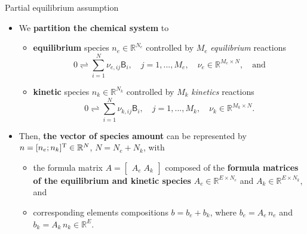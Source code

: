 \begin{frame}{Partial equilibrium assumption}
	\small
	\begin{itemize}
	\item We \alert{\bf partition the chemical system} to
	\begin{itemize}
		\item {\bf equilibrium} species $n_{e} \in \mathbb{R}^{{N}_{e}}$ controlled by $M_e$ \emph{equilibrium} reactions
		\[ 0\rightleftharpoons\sum_{i=1}^{N}\nu_{e,ij}\mathsf{B}_{i}, \quad j=1,...,M_{e},\quad \nu_{e} \in \mathbb{R}^{M_{e}\times N}, \quad \mbox{and}\]
		\item {\bf kinetic} species $n_{k}\in\mathbb{R}^{{N}_{k}}$ controlled by $M_k$ \emph{kinetics} reactions
		\[ 0\rightleftharpoons\sum_{i=1}^{N}\nu_{k,ij}\mathsf{B}_{i}, \quad j=1,...,M_{k},\quad \nu_{k} \in \mathbb{R}^{M_{k}\times N}.  \]
	\end{itemize}
	\item Then, \alert{\bf the vector of species amount} can be represented by $n=[n_{e}; n_{k}]^{\rm T} \in \mathbb{R}^{{N}}$, ${N}={N}_{e}+{N}_{k}$, with 
		\begin{itemize}
		\item the formula matrix $A=\begin{bmatrix} A_{e} \; A_{k} \end{bmatrix}$
		composed of the \alert{\bf formula matrices of the equilibrium and kinetic species} $A_{e}  \in \mathbb{R}^{E \times N_e} $ 
		and $A_{k}  \in \mathbb{R}^{E \times N_k}$, and 
		\item corresponding elements compositions $b = b_e + b_k$, where $b_{e} = A_{e} \, n_e$ and $b_{k} = A_k \, n_k  \in \mathbb{R}^{E}$.
		\end{itemize}
	\end{itemize}
\end{frame}
%
%
